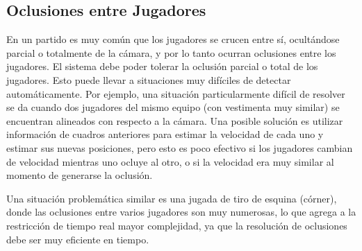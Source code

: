 
\subsection{Oclusiones entre Jugadores}

En un partido es muy común que los jugadores se crucen entre sí, ocultándose
parcial o totalmente de la cámara, y por lo tanto ocurran oclusiones entre los
jugadores. El sistema debe poder tolerar la oclusión parcial o total de los jugadores.
Esto puede llevar a situaciones muy difíciles de detectar automáticamente. Por
ejemplo, una situación particularmente difícil de resolver se da cuando dos
jugadores del mismo equipo (con vestimenta muy similar) se encuentran alineados
con respecto a la cámara. Una posible solución es utilizar información de
cuadros anteriores para estimar la velocidad de cada uno y estimar sus nuevas
posiciones, pero esto es poco efectivo si los jugadores cambian de velocidad
mientras uno ocluye al otro, o si la velocidad era muy similar al momento de
generarse la oclusión.

Una situación problemática similar es una jugada de tiro de esquina (córner),
donde las oclusiones entre varios jugadores son muy numerosas, lo que agrega a
la restricción de tiempo real mayor complejidad, ya que la resolución de
oclusiones debe ser muy eficiente en tiempo.

